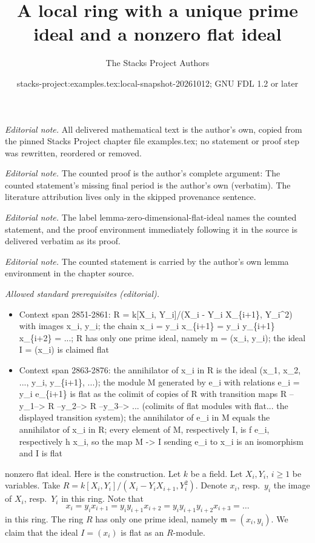 \documentclass[10pt,a4paper]{amsart}
\title{A local ring with a unique prime ideal and a nonzero flat ideal}
\author{The Stacks Project Authors}
\date{stacks-project:examples.tex:local-snapshot-20261012; GNU FDL 1.2 or later}
\theoremstyle{plain}
\theoremstyle{definition}
\theoremstyle{remark}
\numberwithin{equation}{subsection}
\begin{document}
\maketitle
\noindent\textit{Editorial note.} All delivered mathematical text is the author's own, copied from the pinned Stacks Project chapter file examples.tex; no statement or proof step was rewritten, reordered or removed.\par\medskip
\noindent\textit{Editorial note.} The counted proof is the author's complete argument: The counted statement's missing final period is the author's own (verbatim). The literature attribution lives only in the skipped provenance sentence.\par\medskip
\noindent\textit{Editorial note.} The label lemma-zero-dimensional-flat-ideal names the counted statement, and the proof environment immediately following it in the source is delivered verbatim as its proof.\par\medskip
\noindent\textit{Editorial note.} The counted statement is carried by the author's own lemma environment in the chapter source.\par\medskip
\noindent\textit{Allowed standard prerequisites (editorial).}\begin{itemize}
\item Context span 2851-2861: R = k[X\_i, Y\_i]/(X\_i - Y\_i X\_\{i+1\}, Y\_i\textasciicircum{}2) with images x\_i, y\_i; the chain x\_i = y\_i x\_\{i+1\} = y\_i y\_\{i+1\} x\_\{i+2\} = ...; R has only one prime ideal, namely m = (x\_i, y\_i); the ideal I = (x\_i) is claimed flat
\item Context span 2863-2876: the annihilator of x\_i in R is the ideal (x\_1, x\_2, ..., y\_i, y\_\{i+1\}, ...); the module M generated by e\_i with relations e\_i = y\_i e\_\{i+1\} is flat as the colimit of copies of R with transition maps R --y\_1--> R --y\_2--> R --y\_3--> ... (colimits of flat modules with flat... the displayed transition system); the annihilator of e\_i in M equals the annihilator of x\_i in R; every element of M, respectively I, is f e\_i, respectively h x\_i, so the map M -> I sending e\_i to x\_i is an isomorphism and I is flat
\end{itemize}\medskip
nonzero flat ideal. Here is the construction. Let $k$ be a field.
Let $X_i, Y_i$, $i \geq 1$ be variables. Take
$R = k[X_i, Y_i]/(X_i - Y_i X_{i + 1}, Y_i^2)$. Denote $x_i$, resp.\ $y_i$
the image of $X_i$, resp.\ $Y_i$ in this ring. Note that
$$
x_i = y_i x_{i + 1} = y_i y_{i +1} x_{i + 2} =
y_i y_{i + 1} y_{i + 2} x_{i + 3} = \ldots
$$
in this ring. The ring $R$ has only
one prime ideal, namely $\mathfrak m = (x_i, y_i)$. We claim that
the ideal $I = (x_i)$ is flat as an $R$-module.
\end{document}
